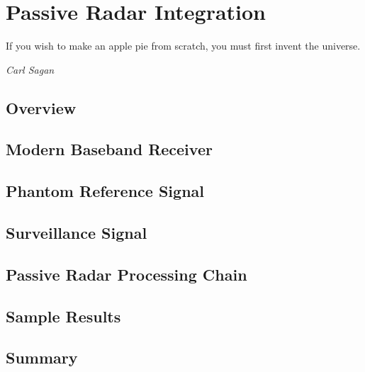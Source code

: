 \documentclass[class=report,11pt,crop=false]{standalone}
\begin{document}
\chapter{Passive Radar Integration}
\epigraph{If you wish to make an apple pie from scratch, you must first invent the universe.}%
    {\emph{Carl Sagan}}

\section{Overview}

\section{Modern Baseband Receiver}

\section{Phantom Reference Signal}

\section{Surveillance Signal}

\section{Passive Radar Processing Chain}

\section{Sample Results}


\section{Summary}








\ifstandalone

\printnoidxglossary[type=\acronymtype,nonumberlist]
\fi
\end{document}
